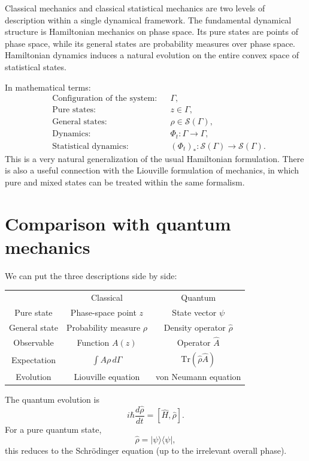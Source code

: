 Classical mechanics and classical statistical mechanics are two levels of
description within a single dynamical framework. The fundamental dynamical
structure is Hamiltonian mechanics on phase space. Its pure states are points
of phase space, while its general states are probability measures over phase
space. Hamiltonian dynamics induces a natural evolution on the entire convex
space of statistical states.

In mathematical terms:
\[
\boxed{
\begin{aligned}
&\text{Configuration of the system:} &&\Gamma,\\
&\text{Pure states:} &&z\in\Gamma,\\
&\text{General states:} &&\rho\in\mathcal S(\Gamma),\\
&\text{Dynamics:} &&\Phi_t:\Gamma\to\Gamma,\\
&\text{Statistical dynamics:} &&
(\Phi_t)_*:\mathcal S(\Gamma)\to\mathcal S(\Gamma).
\end{aligned}
}
\]
This is a very natural generalization of the usual Hamiltonian formulation.
There is also a useful connection with the Liouville formulation of mechanics,
in which pure and mixed states can be treated within the same formalism.

\section{Comparison with quantum mechanics}
We can put the three descriptions side by side:
\begin{table}
    \begin{tabular}{ccc}
        &Classical&	Quantum\\
        Pure state&	Phase-space point \(z\)	&State vector \(\psi\) \\
        General state&	Probability measure \(\rho\)&	Density operator \(\hat\rho\)\\
        Observable	&Function \(A(z)\)&	Operator \(\hat A\)\\
        Expectation	&\(\int A\rho\,d\Gamma\)&	\(\mathrm{Tr}(\hat\rho\hat A)\)\\
        Evolution&	Liouville equation&	von Neumann equation\\
    \end{tabular}
\end{table}
The quantum evolution is
\[i\hbar\frac{d\hat\rho}{dt}=[\hat H,\hat\rho].\]
For a pure quantum state,
\[\hat\rho=|\psi\rangle\langle\psi|,\]
this reduces to the Schrödinger equation (up to the irrelevant overall phase).


